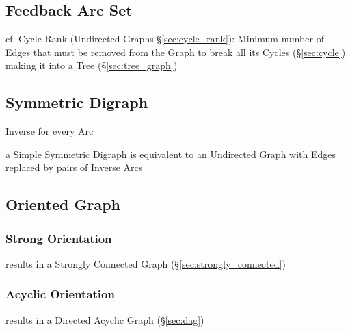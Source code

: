 \subsection{Feedback Arc Set}\label{sec:feedback_arc_set}

\fist cf. Cycle Rank (Undirected Graphs \S\ref{sec:cycle_rank}): Minimum number
of Edges that must be removed from the Graph to break all its Cycles
(\S\ref{sec:cycle}) making it into a Tree (\S\ref{sec:tree_graph})




\subsection{Symmetric Digraph}\label{sec:symmetric_digraph}

Inverse for every Arc

a Simple Symmetric Digraph is equivalent to an Undirected Graph with
Edges replaced by pairs of Inverse Arcs



\subsection{Oriented Graph}\label{sec:oriented_graph}

\subsubsection{Strong Orientation}\label{sec:strong_orientation}

results in a Strongly Connected Graph (\S\ref{sec:strongly_connected})



\subsubsection{Acyclic Orientation}\label{sec:acyclic_orientation}

results in a Directed Acyclic Graph (\S\ref{sec:dag})



